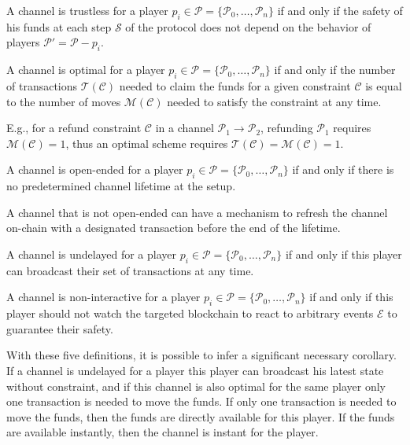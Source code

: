 \begin{definition}[Trustless]
  A channel is trustless for a player $p_i \in \mathcal{P} = \{\mathcal{P}_0,
  \dots, \mathcal{P}_n\}$ if and only if the safety of his funds at each step
  $\mathcal{S}$ of the protocol does not depend on the behavior of players $\mathcal{P}' =
  \mathcal{P} - p_i$.
\end{definition}

\begin{definition}[Optimal]
  A channel is optimal for a player $p_i \in \mathcal{P} = \{\mathcal{P}_0, \dots,
  \mathcal{P}_n\}$ if and only if the number of transactions
  $\mathcal{T}(\mathcal{C})$ needed to claim the funds for a given constraint
  $\mathcal{C}$ is equal to the number of moves $\mathcal{M}(\mathcal{C})$ needed
  to satisfy the constraint at any time.
\end{definition}

E.g., for a refund constraint $\mathcal{C}$ in a channel $\mathcal{P}_1 \rightarrow \mathcal{P}_2$,
refunding $\mathcal{P}_1$ requires $\mathcal{M}(\mathcal{C}) = 1$, thus
an optimal scheme requires $\mathcal{T}(\mathcal{C}) = \mathcal{M}(\mathcal{C}) = 1$.

\begin{definition}
  A channel is open-ended for a player $p_i \in \mathcal{P} = \{\mathcal{P}_0,
  \dots, \mathcal{P}_n\}$ if and only if there is no predetermined channel
  lifetime at the setup.
\end{definition}

A channel that is not open-ended can have a mechanism to refresh the channel
on-chain with a designated transaction before the end of the lifetime.

\begin{definition}[Undelayed]
  A channel is undelayed for a player $p_i \in \mathcal{P} = \{\mathcal{P}_0,
  \dots, \mathcal{P}_n\}$ if and only if this player can broadcast their set of
  transactions at any time.
\end{definition}

\begin{definition}
  A channel is non-interactive for a player $p_i \in \mathcal{P} =
  \{\mathcal{P}_0, \dots, \mathcal{P}_n\}$ if and only if this player should not
  watch the targeted blockchain to react to arbitrary events $\mathcal{E}$ to
  guarantee their safety.
\end{definition}

With these five definitions, it is possible to infer a significant necessary
corollary. If a channel is undelayed for a player this player can broadcast his
latest state without constraint, and if this channel is also optimal for the
same player only one transaction is needed to move the funds. If only one
transaction is needed to move the funds, then the funds are directly available
for this player. If the funds are available instantly, then the channel is
instant for the player.

